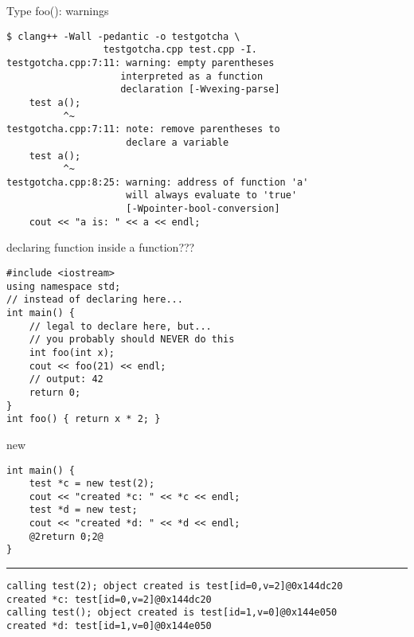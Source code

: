 \begin{frame}[fragile,label=gotchaWarnings]{Type foo(): warnings}
\begin{lstlisting}
$ clang++ -Wall -pedantic -o testgotcha \
                 testgotcha.cpp test.cpp -I.
testgotcha.cpp:7:11: warning: empty parentheses
                    interpreted as a function
                    declaration [-Wvexing-parse]
    test a();
          ^~
testgotcha.cpp:7:11: note: remove parentheses to
                     declare a variable
    test a();
          ^~
testgotcha.cpp:8:25: warning: address of function 'a'
                     will always evaluate to 'true'
                     [-Wpointer-bool-conversion]
    cout << "a is: " << a << endl;
\end{lstlisting}
\end{frame}

\begin{frame}[fragile,label=funcInFuncQ]{declaring function inside a function???}
\begin{lstlisting}
#include <iostream>
using namespace std;
// instead of declaring here...
int main() {
    // legal to declare here, but...
    // you probably should NEVER do this
    int foo(int x);
    cout << foo(21) << endl;
    // output: 42
    return 0;
}
int foo() { return x * 2; }
\end{lstlisting}
\end{frame}

\begin{frame}[fragile,label=testnew]{new}
\begin{lstlisting}
int main() {
    test *c = new test(2);
    cout << "created *c: " << *c << endl;
    test *d = new test;
    cout << "created *d: " << *d << endl;
    @2return 0;2@
}
\end{lstlisting}
\hrule
{}
\begin{lstlisting}
calling test(2); object created is test[id=0,v=2]@0x144dc20
created *c: test[id=0,v=2]@0x144dc20
calling test(); object created is test[id=1,v=0]@0x144e050
created *d: test[id=1,v=0]@0x144e050
\end{lstlisting}
\end{frame}

